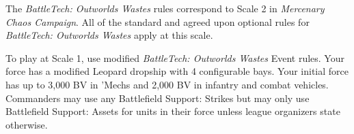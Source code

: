 The \emph{BattleTech: Outworlds Wastes} rules correspond to Scale 2 in \emph{Mercenary Chaos Campaign}.
All of the standard and agreed upon optional rules for \emph{BattleTech: Outworlds Wastes} apply at this scale.

To play at Scale 1, use modified \emph{BattleTech: Outworlds Wastes} Event rules.
Your force has a modified Leopard dropship with 4 configurable bays.
Your initial force has up to 3,000 BV in 'Mechs and 2,000 BV in infantry and combat vehicles.
Commanders may use any Battlefield Support: Strikes but may only use Battlefield Support: Assets for units in their force unless league organizers state otherwise.
